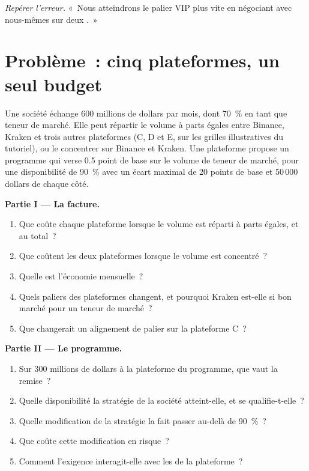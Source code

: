 \begin{exercise}[$\star\star\star$]\label{exo:m3:getting-access-crypto-venues:8}
\emph{Repérer l'erreur.} «~Nous atteindrons le palier VIP plus vite en négociant avec nous-mêmes sur deux .~»
\end{exercise}

\section{Problème~: cinq plateformes, un seul budget}

\begin{problem}\label{pb:m3:getting-access-crypto-venues:1}
Une société échange 600 millions de dollars par mois, dont 70~\% en tant que teneur de marché. Elle peut répartir le volume à parts égales entre Binance, Kraken et trois autres plateformes (C, D et E, sur les
grilles illustratives du tutoriel), ou le concentrer sur Binance et Kraken. Une plateforme propose un programme qui verse 0.5 point de base sur le volume de teneur de marché, pour une
disponibilité de 90~\% avec un écart maximal de 20 points de base et 50\,000 dollars de chaque côté.

\medskip\noindent\textbf{Partie I --- La facture.}
\begin{enumerate}
\item Que coûte chaque plateforme lorsque le volume est réparti à parts égales, et au total~?
\item Que coûtent les deux plateformes lorsque le volume est concentré~?
\item Quelle est l'économie mensuelle~?
\item Quels paliers des plateformes changent, et pourquoi Kraken est-elle si bon marché pour un teneur de marché~?
\item Que changerait un alignement de palier sur la plateforme C~?
\end{enumerate}

\medskip\noindent\textbf{Partie II --- Le programme.}
\begin{enumerate}[resume]
\item Sur 300 millions de dollars à la plateforme du programme, que vaut la remise~?
\item Quelle disponibilité la stratégie de la société atteint-elle, et se qualifie-t-elle~?
\item Quelle modification de la stratégie la fait passer au-delà de 90~\%~?
\item Que coûte cette modification en risque~?
\item Comment l'exigence interagit-elle avec les  de la plateforme~?
\end{enumerate}


\end{problem}

